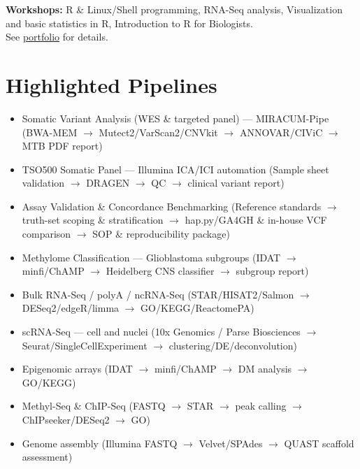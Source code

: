 \documentclass[10pt, a4paper]{article}
\begin{document}
\noindent\textbf{Workshops:} R \& Linux/Shell programming, RNA-Seq analysis, Visualization and
basic statistics in R, Introduction to R for Biologists.\\
See \href{https://mortezasabri.github.io/#teaching}{portfolio} for details.

\section{Highlighted Pipelines}

\begin{itemize}
  \item Somatic Variant Analysis (WES \& targeted panel) --- MIRACUM-Pipe
        (BWA-MEM $\rightarrow$ Mutect2/VarScan2/CNVkit $\rightarrow$ ANNOVAR/CIViC $\rightarrow$ MTB PDF report)
  \item TSO500 Somatic Panel --- Illumina ICA/ICI automation
        (Sample sheet validation $\rightarrow$ DRAGEN $\rightarrow$ QC $\rightarrow$ clinical variant report)
  \item Assay Validation \& Concordance Benchmarking
        (Reference standards $\rightarrow$ truth-set scoping \& stratification $\rightarrow$
        hap.py/GA4GH \& in-house VCF comparison $\rightarrow$ SOP \& reproducibility package)
  \item Methylome Classification --- Glioblastoma subgroups
        (IDAT $\rightarrow$ minfi/ChAMP $\rightarrow$ Heidelberg CNS classifier $\rightarrow$ subgroup report)
  \item Bulk RNA-Seq / polyA / ncRNA-Seq
        (STAR/HISAT2/Salmon $\rightarrow$ DESeq2/edgeR/limma $\rightarrow$ GO/KEGG/ReactomePA)
  \item scRNA-Seq --- cell and nuclei
        (10x Genomics / Parse Biosciences $\rightarrow$ Seurat/SingleCellExperiment $\rightarrow$ clustering/DE/deconvolution)
  \item Epigenomic arrays
        (IDAT $\rightarrow$ minfi/ChAMP $\rightarrow$ DM analysis $\rightarrow$ GO/KEGG)
  \item Methyl-Seq \& ChIP-Seq
        (FASTQ $\rightarrow$ STAR $\rightarrow$ peak calling $\rightarrow$ ChIPseeker/DESeq2 $\rightarrow$ GO)
  \item Genome assembly
        (Illumina FASTQ $\rightarrow$ Velvet/SPAdes $\rightarrow$ QUAST scaffold assessment)
\end{itemize}
\end{document}
